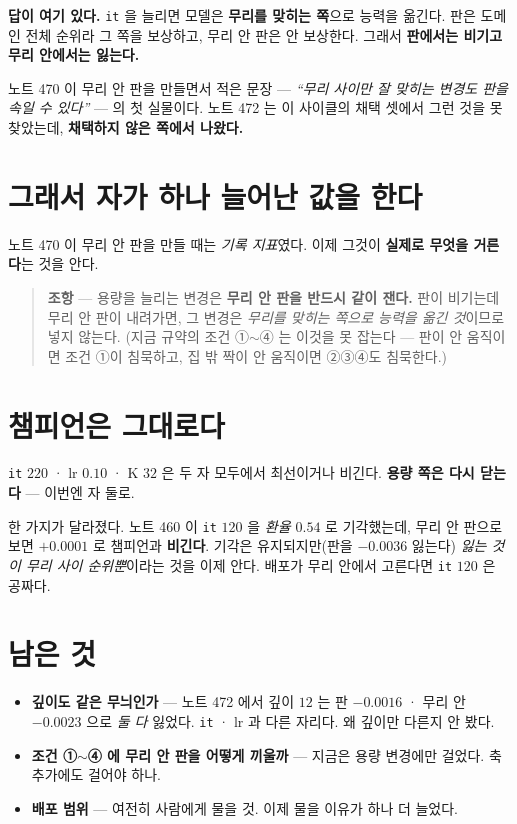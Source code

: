 \documentclass[11pt]{article}
\begin{document}
\textbf{답이 여기 있다.} \texttt{it} 을 늘리면 모델은 \textbf{무리를
맞히는 쪽}으로 능력을 옮긴다. 판은 도메인 전체 순위라 그 쪽을 보상하고,
무리 안 판은 안 보상한다. 그래서 \textbf{판에서는 비기고 무리 안에서는
잃는다.}

노트 470 이 무리 안 판을 만들면서 적은 문장 --- \emph{``무리 사이만 잘
맞히는 변경도 판을 속일 수 있다''} --- 의 첫 실물이다. 노트 472 는 이
사이클의 채택 셋에서 그런 것을 못 찾았는데, \textbf{채택하지 않은
쪽에서 나왔다.}

\section{그래서 자가 하나 늘어난 값을 한다}

노트 470 이 무리 안 판을 만들 때는 \emph{기록 지표}였다. 이제 그것이
\textbf{실제로 무엇을 거른다}는 것을 안다.

\begin{quote}
\textbf{조항} --- 용량을 늘리는 변경은 \textbf{무리 안 판을 반드시 같이
잰다.} 판이 비기는데 무리 안 판이 내려가면, 그 변경은 \emph{무리를
맞히는 쪽으로 능력을 옮긴 것}이므로 넣지 않는다. (지금 규약의 조건
①$\sim$④ 는 이것을 못 잡는다 --- 판이 안 움직이면 조건 ①이 침묵하고,
집 밖 짝이 안 움직이면 ②③④도 침묵한다.)
\end{quote}

\section{챔피언은 그대로다}

\texttt{it} $220$ · lr $0.10$ · K $32$ 은 두 자 모두에서 최선이거나
비긴다. \textbf{용량 쪽은 다시 닫는다} --- 이번엔 자 둘로.

한 가지가 달라졌다. 노트 460 이 \texttt{it} $120$ 을 \emph{환율 $0.54$}
로 기각했는데, 무리 안 판으로 보면 $+0.0001$ 로 챔피언과 \textbf{비긴다}.
기각은 유지되지만(판을 $-0.0036$ 잃는다) \emph{잃는 것이 무리 사이
순위뿐}이라는 것을 이제 안다. 배포가 무리 안에서 고른다면 \texttt{it}
$120$ 은 공짜다.

\section*{남은 것}

\begin{itemize}
\item \textbf{깊이도 같은 무늬인가} --- 노트 472 에서 깊이 $12$ 는 판
$-0.0016$ · 무리 안 $-0.0023$ 으로 \emph{둘 다} 잃었다. \texttt{it} ·
lr 과 다른 자리다. 왜 깊이만 다른지 안 봤다.
\item \textbf{조건 ①$\sim$④ 에 무리 안 판을 어떻게 끼울까} --- 지금은
용량 변경에만 걸었다. 축 추가에도 걸어야 하나.
\item \textbf{배포 범위} --- 여전히 사람에게 물을 것. 이제 물을 이유가
하나 더 늘었다.
\end{itemize}
\end{document}

